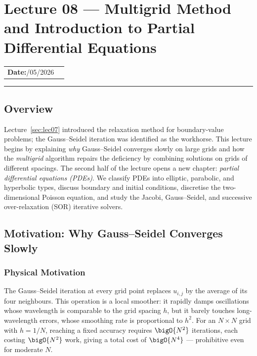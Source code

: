 
\section{Lecture 08 — Multigrid Method and Introduction to
  Partial Differential Equations}\label{sec:lec08}

\begin{center}
\begin{tabular}{ll}
  \textbf{Date:}\quad 10/05/2026 & \\
\end{tabular}
\end{center}
\hrule\vspace{1.5em}

\subsection*{Overview}
Lecture~\ref{sec:lec07} introduced the relaxation method for boundary-value
problems; the Gauss–Seidel iteration was identified as the workhorse.
This lecture begins by explaining \emph{why} Gauss–Seidel converges
slowly on large grids and how the \emph{multigrid} algorithm repairs
the deficiency by combining solutions on grids of different spacings.
The second half of the lecture opens a new chapter: \emph{partial
differential equations (PDEs)}. We classify PDEs into elliptic,
parabolic, and hyperbolic types, discuss boundary and initial
conditions, discretise the two-dimensional Poisson equation, and
study the Jacobi, Gauss–Seidel, and successive over-relaxation (SOR)
iterative solvers.

\subsection{Motivation: Why Gauss–Seidel Converges Slowly}
\label{subsec:lec08:gs-slow}

\subsubsection*{Physical Motivation}
The Gauss–Seidel iteration at every grid point replaces $u_{i,j}$ by
the average of its four neighbours. This operation is a local smoother:
it rapidly damps oscillations whose wavelength is comparable to the
grid spacing $h$, but it barely touches long-wavelength errors, whose
smoothing rate is proportional to $h^2$.  For an $N\times N$ grid with
$h=1/N$, reaching a fixed accuracy requires $\bigO{N^2}$ iterations,
each costing $\bigO{N^2}$ work, giving a total cost of
$\bigO{N^4}$ — prohibitive even for moderate $N$.

